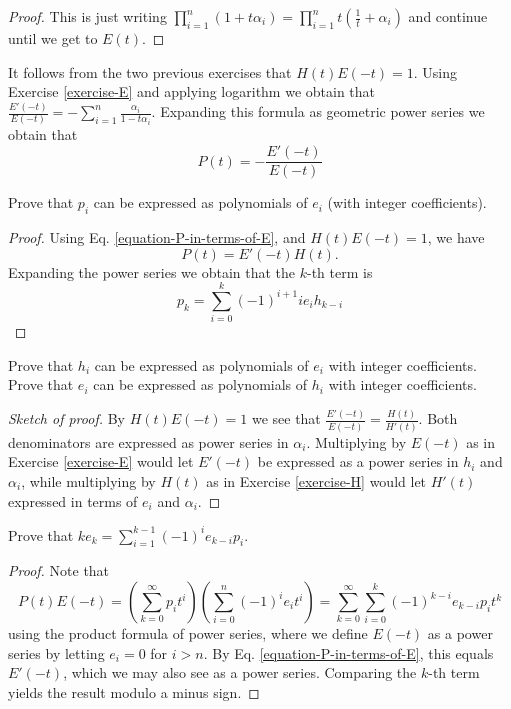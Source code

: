 \begin{proof}
This is just writing $\prod_{i=1}^n(1+t\alpha_i)
=\prod_{i=1}^nt(\frac{1}{t}+\alpha_i)$ and continue until we get to $E(t)$.
\end{proof}

\noindent
It follows from the two previous exercises that $H(t)E(-t)=1$. Using Exercise
\ref{exercise-E} and applying logarithm we obtain that
$\frac{E'(-t)}{E(-t)}=-\sum_{i=1}^n \frac{\alpha_i}{1-t\alpha_i}$. Expanding
this formula as geometric power series we obtain that 
\begin{equation}
\label{equation-P-in-terms-of-E}
P(t)=-\frac{E'(-t)}{E(-t)}
\end{equation}

\begin{exercise}
\label{exercise-p-polynomials-of-e}
Prove that $p_i$ can be expressed as polynomials of $e_i$ (with integer
coefficients).
\end{exercise}

\begin{proof}
Using Eq. \ref{equation-P-in-terms-of-E}, and $H(t)E(-t)=1$, we have
$$
P(t)=E'(-t)H(t).
$$
Expanding the power series we obtain that the $k$-th term is
$$
p_k=\sum_{i=0}^k(-1)^{i+1}ie_ih_{k-i}
$$
\end{proof}

\begin{exercise}
\label{exercise-h-and-e}
Prove that $h_i$ can be expressed as polynomials of $e_i$ with integer
coefficients. Prove that $e_i$ can be expressed as polynomials of $h_i$ with
integer coefficients.
\end{exercise}

\begin{proof}[Sketch of proof]
By $H(t)E(-t)=1$ we see that $\frac{E'(-t)}{E(-t)}=\frac{H(t)}{H'(t)}$. Both
denominators are expressed as power series in $\alpha_i$. Multiplying by $E(-t)$
as in Exercise \ref{exercise-E} 
would let $E'(-t)$ be expressed as a power series in $h_i$ and
$\alpha_i$, while multiplying by $H(t)$ as in Exercise \ref{exercise-H} would 
let $H'(t)$ expressed in terms of
$e_i$ and $\alpha_i$.
\end{proof}

\begin{exercise}
\label{exercise-Newton-formula}
Prove that $ke_k=\sum_{i=1}^{k-1}(-1)^ie_{k-i}p_i$.
\end{exercise}

\begin{proof}
Note that
$$
P(t)E(-t)=\left(\sum_{k=0}^{\infty} p_it^i\right)
\left(\sum_{i=0}^n(-1)^ie_it^i\right)
=\sum_{k=0}^\infty \sum_{i=0}^k (-1)^{k-i}e_{k-i}p_it^k
$$
using the product formula of power series, where we define $E(-t)$ as a power
series by letting $e_i=0$ for $i>n$. By Eq. \ref{equation-P-in-terms-of-E}, this
equals $E'(-t)$, which we may also see as a power series. Comparing the $k$-th
term yields the result modulo a minus sign.
\end{proof}

